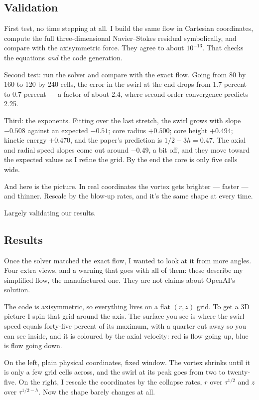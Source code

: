 \subsection{Validation}
First test, no time stepping at all. I build the same flow in Cartesian coordinates, compute the full three-dimensional Navier--Stokes residual symbolically, and compare with the axisymmetric force. They agree to about $10^{-13}$. That checks the equations \emph{and} the code generation.

Second test: run the solver and compare with the exact flow. Going from 80 by 160 to 120 by 240 cells, the error in the swirl at the end drops from 1.7 percent to 0.7 percent --- a factor of about 2.4, where second-order convergence predicts 2.25.

Third: the exponents. Fitting over the last stretch, the swirl grows with slope $-0.508$ against an expected $-0.51$; core radius $+0.500$; core height $+0.494$; kinetic energy $+0.470$, and the paper's prediction is $1/2-3h=0.47$. The axial and radial speed slopes come out around $-0.49$, a bit off, and they move toward the expected values as I refine the grid. By the end the core is only five cells wide.

And here is the picture. In real coordinates the vortex gets brighter --- faster --- and thinner. Rescale by the blow-up rates, and it's the same shape at every time.

Largely validating our results.
\subsection{Results}
Once the solver matched the exact flow, I wanted to look at it from more angles. Four extra views, and a warning that goes with all of them: these describe my simplified flow, the manufactured one. They are not claims about OpenAI's solution.

The code is axisymmetric, so everything lives on a flat $(r,z)$ grid. To get a 3D picture I spin that grid around the axis. The surface you see is where the swirl speed equals forty-five percent of its maximum, with a quarter cut away so you can see inside, and it is coloured by the axial velocity: red is flow going up, blue is flow going down.

On the left, plain physical coordinates, fixed window. The vortex shrinks until it is only a few grid cells across, and the swirl at its peak goes from two to twenty-five. On the right, I rescale the coordinates by the collapse rates, $r$ over $\tau^{1/2}$ and $z$ over $\tau^{1/2-h}$. Now the shape barely changes at all.

